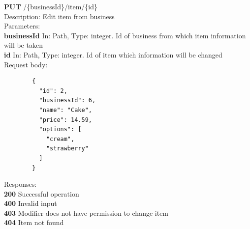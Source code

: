 \documentclass[11pt,a4paper,pdftex]{article}
\begin{document}
\hspace*{1em}\textbf{PUT} /\{businessId\}/item/\{id\}\\
\hspace*{2em}Description: Edit item from business\\
\hspace*{2em}Parameters:\\
\hspace*{3em}\textbf{businessId} In: Path, Type: integer. Id of business from which item information will be taken\\
\hspace*{3em}\textbf{id} In: Path, Type: integer. Id of item which information will be changed\\
\hspace*{2em}Request body:\\
\begin{verbatim}
        {
          "id": 2,
          "businessId": 6,
          "name": "Cake",
          "price": 14.59,
          "options": [
            "cream",
            "strawberry"
          ]
        }
\end{verbatim}
\hspace*{2em}Responses:\\
\hspace*{3em}\textbf{200} Successful operation\\
\hspace*{3em}\textbf{400} Invalid input\\
\hspace*{3em}\textbf{403} Modifier does not have permission to change item\\
\hspace*{3em}\textbf{404} Item not found
\end{document}
